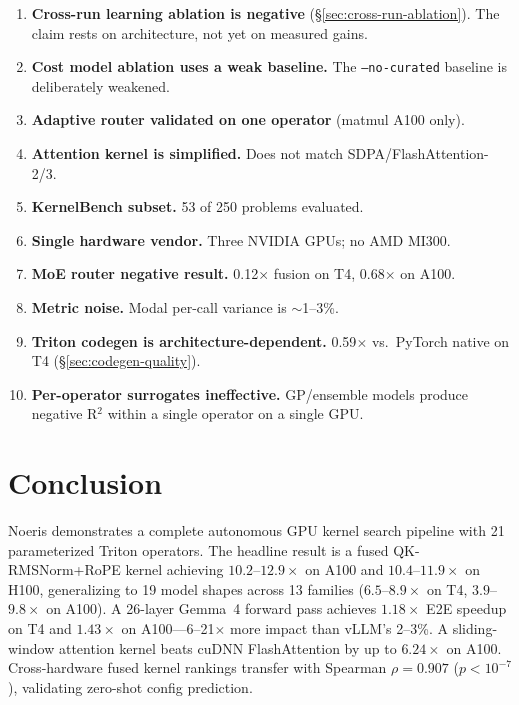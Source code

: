 \documentclass[11pt]{article}
\begin{document}
\begin{enumerate}[leftmargin=*,itemsep=2pt]
\item \textbf{Cross-run learning ablation is negative} (\S\ref{sec:cross-run-ablation}).
The claim rests on architecture, not yet on measured gains.

\item \textbf{Cost model ablation uses a weak baseline.} The
\texttt{--no-curated} baseline is deliberately weakened.

\item \textbf{Adaptive router validated on one operator} (matmul A100 only).

\item \textbf{Attention kernel is simplified.} Does not match SDPA/FlashAttention-2/3.

\item \textbf{KernelBench subset.} 53 of 250 problems evaluated.

\item \textbf{Single hardware vendor.} Three NVIDIA GPUs; no AMD MI300.

\item \textbf{MoE router negative result.} 0.12$\times$ fusion on T4, 0.68$\times$ on A100.

\item \textbf{Metric noise.} Modal per-call variance is ${\sim}$1--3\%.

\item \textbf{Triton codegen is architecture-dependent.} 0.59$\times$ vs.\ PyTorch native
on T4 (\S\ref{sec:codegen-quality}).

\item \textbf{Per-operator surrogates ineffective.} GP/ensemble models produce
negative R$^2$ within a single operator on a single GPU.
\end{enumerate}


\section{Conclusion}
\label{sec:conclusion}

Noeris demonstrates a complete autonomous GPU kernel search pipeline with
21 parameterized Triton operators. The headline result is a fused
QK-RMSNorm+RoPE kernel achieving $10.2$--$12.9\times$ on A100 and
$10.4$--$11.9\times$ on H100, generalizing to 19 model shapes across 13
families ($6.5$--$8.9\times$ on T4, $3.9$--$9.8\times$ on A100). A 26-layer
Gemma~4 forward pass achieves $1.18\times$ E2E speedup on T4 and $1.43\times$ on
A100---6--21$\times$ more impact than vLLM's 2--3\%. A sliding-window attention
kernel beats cuDNN FlashAttention by up to $6.24\times$ on A100. Cross-hardware
fused kernel rankings transfer with Spearman $\rho = 0.907$
($p < 10^{-7}$), validating zero-shot config prediction.
\end{document}
